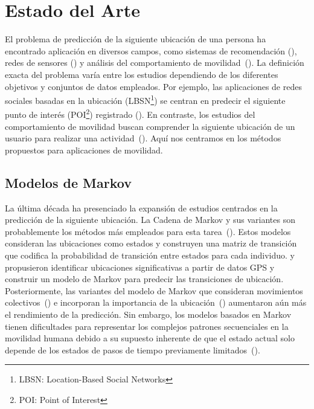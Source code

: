 \chapter{Estado del Arte}\label{chapter:state-of-the-art}
El problema de predicción de la siguiente ubicación de una persona ha encontrado 
aplicación en diversos campos, como sistemas de recomendación (\cite{xue2021mobtcast}), 
redes de sensores (\cite{pirozmand2014human}) y análisis del comportamiento de movilidad~(\cite{wang2021reinforced,xu2022understanding}). 
La definición exacta del problema varía entre los estudios dependiendo de 
los diferentes objetivos y conjuntos de datos empleados. Por ejemplo, 
las aplicaciones de redes sociales basadas en la ubicación (LBSN\footnote{LBSN: Location-Based Social Networks}) se 
centran en predecir el siguiente punto de interés (POI\footnote{POI: Point of Interest}) 
registrado (\cite{wang2022online,xue2021mobtcast}). En contraste, los estudios del comportamiento 
de movilidad buscan comprender la siguiente ubicación de un usuario para 
realizar una actividad~(\cite{solomon2021analyzing}). Aquí nos centramos en los métodos 
propuestos para aplicaciones de movilidad.

\section{Modelos de Markov}
La última década ha presenciado la expansión de estudios centrados en la 
predicción de la siguiente ubicación. La Cadena de Markov y sus variantes 
son probablemente los métodos más empleados para esta tarea~(\cite{luca2021survey}). 
Estos modelos consideran las ubicaciones como estados y construyen una 
matriz de transición que codifica la probabilidad de transición entre 
estados para cada individuo. \cite{ashbrook2002learning} y \cite{gambs2012next} propusieron identificar ubicaciones significativas 
 a partir de datos GPS y construir un modelo de Markov para predecir 
 las transiciones de ubicación. Posteriormente, las variantes del 
 modelo de Markov que consideran movimientos colectivos~(\cite{chen2014nlpm}) e 
 incorporan la importancia de la ubicación~(\cite{huang2017mining}) aumentaron aún 
 más el rendimiento de la predicción. Sin embargo, los modelos basados
en Markov tienen dificultades para representar los complejos patrones
secuenciales en la movilidad humana debido a su supuesto inherente 
de que el estado actual solo depende de los estados de pasos de tiempo
 previamente limitados~(\cite{li2020hierarchical}).

